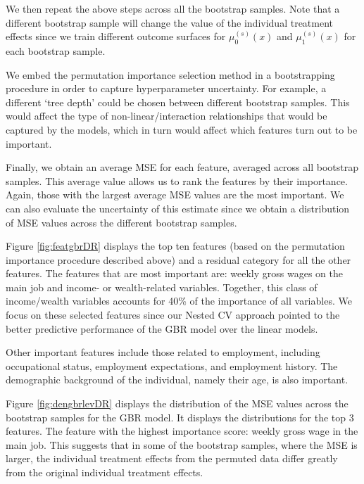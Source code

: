 \documentclass[12pt, a4paper]{article}
\begin{document}
We then repeat the above steps across all the bootstrap samples. Note that a
different bootstrap sample will change the value of the individual treatment
effects since we train different outcome surfaces for $\mu^{(s)}_0(x)$ and
$\mu^{(s)}_1(x)$ for each bootstrap sample.

We embed the permutation importance selection method in a bootstrapping
procedure in order to capture hyperparameter uncertainty. For example, a
different `tree depth' could be chosen between different bootstrap samples.
This would affect the type of non-linear/interaction relationships that would
be captured by the models, which in turn would affect which features turn out
to be important. 

Finally, we obtain an average MSE for each feature, averaged across all
bootstrap samples. This average value allows us to rank the features by their
importance. Again, those with the largest average MSE values are the most
important. We can also evaluate the uncertainty of this estimate since we
obtain a distribution of MSE values across the different bootstrap samples.

Figure \ref{fig:featgbrDR} displays the top ten features (based on the
permutation importance procedure described above) and a residual category for
all the other features. The features that are most important are: weekly gross
wages on the main job and income- or wealth-related variables. Together, this
class of income/wealth variables accounts for 40\% of the importance of all
variables. We focus on these selected features since our Nested CV approach
pointed to the better predictive performance of the GBR model over the linear
models.

Other important features include those related to employment, including
occupational status, employment expectations, and employment history. The
demographic background of the individual, namely their age, is also important. 


Figure \ref{fig:dengbrlevDR} displays the distribution of the MSE values across
the bootstrap samples for the GBR model. It displays the distributions for the
top 3 features. The feature with the highest importance score: weekly gross
wage in the main job. This suggests that in some of the bootstrap samples,
where the MSE is larger, the individual treatment effects from the permuted
data differ greatly from the original individual treatment effects.
\end{document}
